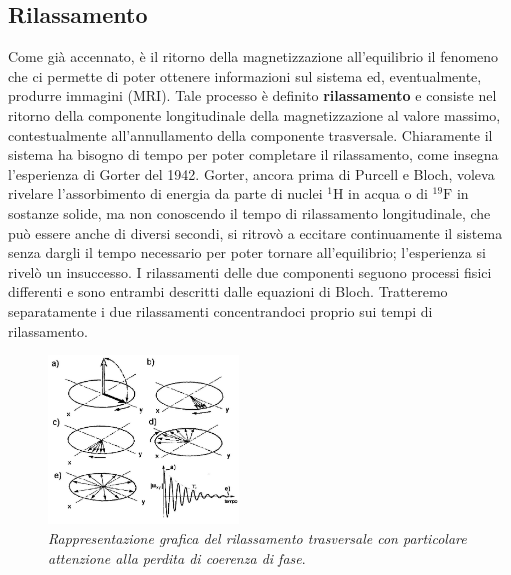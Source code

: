 \documentclass{report}
\numberwithin{equation}{section}
\numberwithin{figure}{section}
\begin{document}
\subsection{Rilassamento}
Come già accennato, è il ritorno della magnetizzazione all'equilibrio il fenomeno che ci permette di poter ottenere informazioni sul sistema ed, eventualmente, produrre immagini (MRI). Tale processo è definito \textbf{rilassamento} e consiste nel ritorno della componente longitudinale della magnetizzazione al valore massimo, contestualmente all'annullamento della componente trasversale. Chiaramente il sistema ha bisogno di tempo per poter completare il rilassamento, come insegna l'esperienza di Gorter del 1942. Gorter, ancora prima di Purcell e Bloch, voleva rivelare l'assorbimento di energia da parte di nuclei $\mathrm{^1H}$ in acqua o di $\mathrm{^{19}F}$ in sostanze solide, ma non conoscendo il tempo di rilassamento longitudinale, che può essere anche di diversi secondi, si ritrovò a eccitare continuamente il sistema senza dargli il tempo necessario per poter tornare all'equilibrio; l'esperienza si rivelò un insuccesso. I rilassamenti delle due componenti seguono processi fisici differenti e sono entrambi descritti dalle equazioni di Bloch. Tratteremo separatamente i due rilassamenti concentrandoci proprio sui tempi di rilassamento.

\begin{figure}
    \centering
    \includegraphics[width=0.45\textwidth]{immagini/trasversale.png}
    \caption{\textit{Rappresentazione grafica del rilassamento trasversale con particolare attenzione alla perdita di coerenza di fase}.}
    \label{fig:trasversale}
\end{figure}
\end{document}
